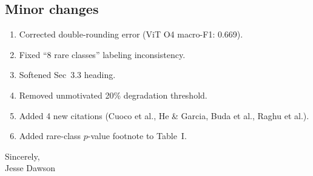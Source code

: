 \documentclass[12pt]{article}
\begin{document}
\subsection*{Minor changes}
\begin{enumerate}
  \item Corrected double-rounding error (ViT O4 macro-F1: 0.669).
  \item Fixed ``8 rare classes'' labeling inconsistency.
  \item Softened Sec~3.3 heading.
  \item Removed unmotivated 20\% degradation threshold.
  \item Added 4 new citations (Cuoco et al., He \& Garcia, Buda et al., Raghu et al.).
  \item Added rare-class $p$-value footnote to Table~I.
\end{enumerate}

\bigskip
\noindent Sincerely,\\
Jesse Dawson
\end{document}
